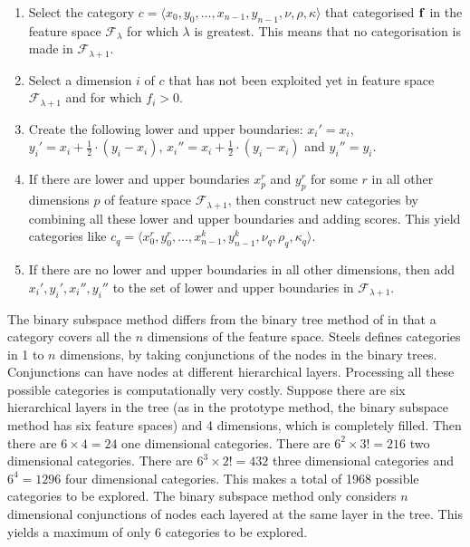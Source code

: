 \begin{enumerate}

\item Select the category $c=\langle x_0,y_0,\ldots,x_{n-1},y_{n-1},\nu,\rho,\kappa \rangle$ that categorised ${\bf f}$ in the feature space ${\mathcal F}_\lambda$ for which $\lambda$ is greatest. This means that no categorisation is made in ${\mathcal F}_{\lambda+1}$.

\item Select a dimension $i$ of $c$ that has not been exploited yet in feature space ${\mathcal F}_{\lambda+1}$ and for which $f_i>0$.

\item Create the following lower and upper boundaries: $x_i'=x_i$, $y_i'=x_i+\frac{1}{2} \cdot (y_i-x_i)$, $x_i''=x_i+\frac{1}{2} \cdot (y_i-x_i)$ and $y_i''=y_i$.

\item If there are lower and upper boundaries $x_p^r$ and $y_p^r$ for some $r$ in all other dimensions $p$ of feature space ${\mathcal F}_{\lambda+1}$, then construct new categories by combining all these lower and upper boundaries and adding scores. This yield categories like $c_q = \langle x_0^r,y_0^r,\ldots,x_{n-1}^k,y_{n-1}^k,\nu_q,\rho_q,\kappa_q \rangle$.

\item If there are no lower and upper boundaries in all other dimensions, then add $x_i',y_i',x_i'',y_i''$ to the set of lower and upper boundaries in ${\mathcal F}_{\lambda+1}$.

\end{enumerate}


The binary subspace method differs from the binary tree method of \citet{steels:1996b} in that a category covers all the $n$ dimensions of the feature space. Steels defines categories in 1 to $n$ dimensions, by taking conjunctions of the nodes in the binary trees. Conjunctions can have nodes at different hierarchical layers. Processing all these possible categories is computationally very costly. Suppose there are six hierarchical layers in the tree (as in the prototype method, the binary subspace method has six feature spaces) and 4 dimensions, which is completely filled. Then there are $6\times4=24$ one dimensional categories. There are $6^2\times3!=216$ two dimensional categories. There are $6^3\times2!=432$ three dimensional categories and $6^4=1296$ four dimensional categories. This makes a total of 1968 possible categories to be explored.  The binary subspace method only considers $n$ dimensional conjunctions of nodes each layered at the same layer in the tree. This yields a maximum of only 6 categories to be explored.

